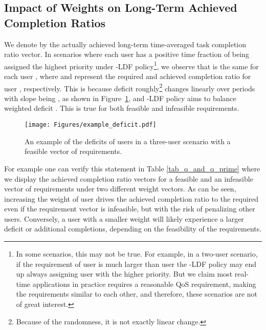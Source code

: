 \documentclass[prodmode,acmtompecs]{acmsmall}
\newcommand{\myComments}[1]{}
\begin{document}
\subsection{Impact of Weights on Long-Term Achieved Completion Ratios}
\label{subsection_effect_weights_long_term}
\myComments{This needs further improvement. }
We denote by  the actually achieved long-term time-averaged task completion ratio vector. 
In scenarios where each user has a positive time fraction of being assigned the highest priority under -LDF policy\footnote{In some scenarios, this may not be true. For example, in a two-user scenario, if the requirement of user  is much larger than user  the -LDF policy may end up always assigning user  with the higher priority. But we claim most real-time applications in practice requires a reasonable QoS requirement, making the requirements similar to each other, and therefore, these scenarios are not of great interest. }, we observe that  is the same for each user , where  and  represent the required and achieved completion ratio for user , respectively. 
This is because deficit  roughly\footnote{Because of the randomness, it is not exactly linear change. } changes linearly over periods with slope being , as shown in Figure~\ref{figure_example_deficit}, and -LDF policy aims to balance weighted deficit . 
This is true for both feasible and infeasible requirements. 

\begin{figure}[htp]
  \centering
  \texttt{[image: Figures/example\_deficit.pdf]}
  \caption{An example of the deficits of users in a three-user scenario with a feasible vector of requirements. }
  \label{figure_example_deficit}
\end{figure}

For example one can verify this statement in Table \ref{tab_q_and_q_prime} where we display the achieved completion ratio vectors for a feasible and an infeasible vector of requirements under two different weight vectors. As can be seen, increasing the weight of user  drives the achieved completion ratio  to the 
required  even if the requirement vector  is infeasible, but with the risk of penalizing other users. Conversely, a user with a smaller weight will likely experience a larger deficit or additional completions, depending on the feasibility of the requirements. 
\end{document}
